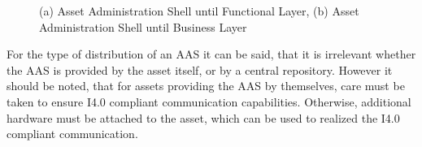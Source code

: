 \begin{figure}[h]
\centering
{}
\caption{(a) Asset Administration Shell until Functional Layer, (b) Asset Administration Shell until Business Layer}
\label{fig:aas-until-func-and-bizz-layer}
\end{figure}

For the type of distribution of an \ac{AAS} it can be said, that it is irrelevant whether the \ac{AAS} is provided by the asset itself, or by a central repository. However it should be noted, that for assets providing the \ac{AAS} by themselves, care must be taken to ensure \ac{I4.0} compliant communication capabilities. Otherwise, additional hardware must be attached to the asset, which can be used to realized the \ac{I4.0} compliant communication.  

